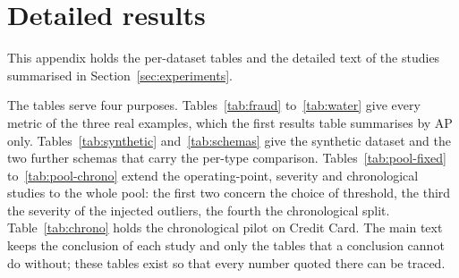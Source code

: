 \documentclass[conference]{IEEEtran}
\begin{document}
\section{Detailed results}
\label{app:details}
This appendix holds the per-dataset tables and the detailed text of the studies summarised in
Section~\ref{sec:experiments}.

The tables serve four purposes. Tables~\ref{tab:fraud} to~\ref{tab:water} give every metric of the
three real examples, which the first results table summarises by AP only. Tables~\ref{tab:synthetic}
and~\ref{tab:schemas} give the synthetic dataset and the two further schemas that carry the
per-type comparison. Tables~\ref{tab:pool-fixed} to~\ref{tab:pool-chrono} extend the operating-point,
severity and chronological studies to the whole pool: the first two concern the choice of threshold,
the third the severity of the injected outliers, the fourth the chronological split. Table~\ref{tab:chrono}
holds the chronological pilot on Credit Card. The main text keeps the conclusion of each study and
only the tables that a conclusion cannot do without; these tables exist so that every number
quoted there can be traced.
\end{document}
